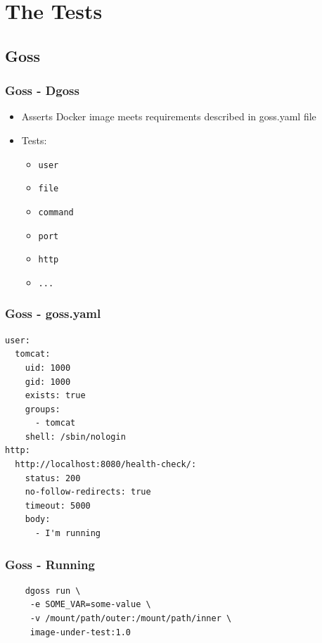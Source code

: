 \documentclass[14pt,aspectratio=169]{beamer}
\begin{document}
\section{The Tests}

\subsection{Goss}

\begin{frame}
  \frametitle{Goss - Dgoss}
  \begin{itemize}
    \item Asserts Docker image meets requirements described in goss.yaml file
    \item Tests:
    \begin{itemize}
    \item \texttt{user}
    \item \texttt{file}
    \item \texttt{command}
    \item \texttt{port}
    \item \texttt{http}
    \item \texttt{...}
    \end{itemize}
  \end{itemize}
\end{frame}

\begin{frame}[fragile]
  \frametitle{Goss - goss.yaml}
  \begin{verbatim}
user:
  tomcat:
    uid: 1000
    gid: 1000
    exists: true
    groups:
      - tomcat
    shell: /sbin/nologin
http:
  http://localhost:8080/health-check/:
    status: 200
    no-follow-redirects: true
    timeout: 5000
    body:
      - I'm running
  \end{verbatim}
\end{frame}

\begin{frame}[fragile]
  \frametitle{Goss - Running}
  \begin{verbatim}
    dgoss run \
     -e SOME_VAR=some-value \
     -v /mount/path/outer:/mount/path/inner \
     image-under-test:1.0
  \end{verbatim}
\end{frame}
\end{document}
